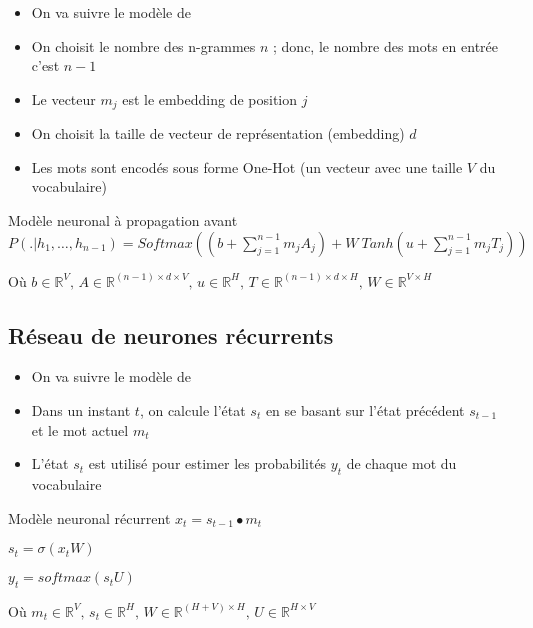 \documentclass{KodeBook}
\begin{document}
\begin{itemize}
	\item On va suivre le modèle de \cite{2003-bengio-al}
	\item On choisit le nombre des n-grammes $n$ ; donc, le nombre des mots en entrée c'est $n-1$
	\item Le vecteur $m_j$ est le embedding de position $j$
	\item On choisit la taille de vecteur de représentation (embedding) $d$
	\item Les mots sont encodés sous forme One-Hot (un vecteur avec une taille $V$ du vocabulaire)
\end{itemize}

\begin{block}{Modèle neuronal à propagation avant}
	$
	P(.|h_1,\ldots, h_{n-1}) = 
	Softmax \left(
	(b + \sum\limits_{j=1}^{n-1} m_j A_j) 
	+ 
	W\ Tanh(u + \sum\limits_{j=1}^{n-1} m_j T_j)
	\right)
	$
	
	Où $b \in \mathbb{R}^{V},\, A \in \mathbb{R}^{(n-1) \times d \times V},\, u \in \mathbb{R}^{H},\, T \in \mathbb{R}^{(n-1) \times d \times H},\, W \in \mathbb{R}^{V \times H}$
\end{block}


\subsection{Réseau de neurones récurrents}

\begin{itemize}
	\item On va suivre le modèle de \cite{2010-mokolov-al}
	\item Dans un instant $t$, on calcule l'état $s_t$ en se basant sur l'état précédent $s_{t-1}$ et le mot actuel $m_t$
	\item L'état $s_t$ est utilisé pour estimer les probabilités $y_t$ de chaque mot du vocabulaire
\end{itemize}

\begin{block}{Modèle neuronal récurrent}
	$x_t = s_{t-1} \bullet m_t$
	
	$s_t = \sigma(x_t W)$
	
	$y_t = softmax(s_t U)$
	
	Où $m_t \in \mathbb{R}^{V},\, s_t \in \mathbb{R}^{H},\, W \in \mathbb{R}^{(H+V)\times H},\, U \in \mathbb{R}^{H\times V}$
\end{block}
\end{document}
